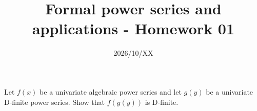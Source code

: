 

\title{Formal power series and applications - Homework 01}
\date{2026/10/XX}
\author{}



\maketitle

\begin{problem}
	Let $f(x)$ be a univariate algebraic power series and let $g(y)$ be a univariate D-finite power series.
	Show that $f(g(y))$ is D-finite.
\end{problem}
\begin{solution}
\end{solution}




